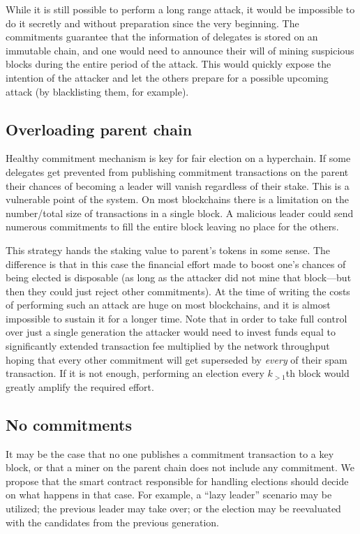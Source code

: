 While it is still possible to perform a long range attack, it would be
impossible to do it secretly and without preparation since the very beginning.
The commitments guarantee that the information of delegates is stored on an
immutable chain, and one would need to announce their will of mining suspicious
blocks during the entire period of the attack. This would quickly expose the
intention of the attacker and let the others prepare for a possible upcoming
attack (by blacklisting them, for example).

\subsection{Overloading parent chain}

Healthy commitment mechanism is key for fair election on a hyperchain. If some
delegates get prevented from publishing commitment transactions on the
parent their chances of becoming a leader will vanish regardless of their stake.
This is a vulnerable point of the system. On most blockchains there is a
limitation on the number/total size of transactions in a single block. A
malicious leader could send numerous commitments to fill the entire block
leaving no place for the others.

This strategy hands the staking value to parent's tokens in some sense. The
difference is that in this case the financial effort made to boost one's chances
of being elected is disposable (as long as the attacker did not mine that
block---but then they could just reject other commitments). At the time of
writing the costs of performing such an attack are huge on most blockchains, and
it is almost impossible to sustain it for a longer time. Note that in order to
take full control over just a single generation the attacker would need to
invest funds equal to significantly extended transaction fee multiplied by the
network throughput hoping that every other commitment will get superseded by
\textit{every} of their spam transaction. If it is not enough, performing an
election every $k_{> 1}$th block would greatly amplify the required effort.

\subsection{No commitments}

It may be the case that no one publishes a commitment transaction to a key
block, or that a miner on the parent chain does not include any commitment. We
propose that the smart contract responsible for handling elections should decide
on what happens in that case. For example, a ``lazy leader'' scenario may be
utilized; the previous leader may take over; or the election may be reevaluated
with the candidates from the previous generation.
